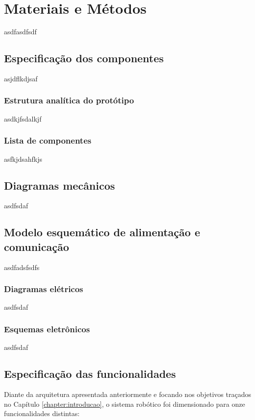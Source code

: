 \chapter{Materiais e Métodos}
\label{chap:mat}
asdfasdfsdf

\section{Especificação dos componentes}
\label{sec:espc}
asjdflkdjsaf

\subsection{Estrutura analítica do protótipo}
\label{ssec:pbs}
asdkjfsdalkjf

\subsection{Lista de componentes}
\label{ssec:list}
asfkjdsahfkjs


\section{Diagramas mecânicos}
\label{sec:diagm}
asdfsdaf

\section{Modelo esquemático de alimentação e comunicação}
\label{sec:modesq}
asdfadsfsdfs

\subsection{Diagramas elétricos}
\label{sec:diage}
asdfsdaf

\subsection{Esquemas eletrônicos}
\label{ssec:esqe}
asdfsdaf

\section{Especificação das funcionalidades}
\label{sec:espf}
Diante da arquitetura apresentada anteriormente e focando nos objetivos traçados no Capítulo \ref{chapter:introducao}, o sistema robótico foi dimensionado para onze funcionalidades distintas:

